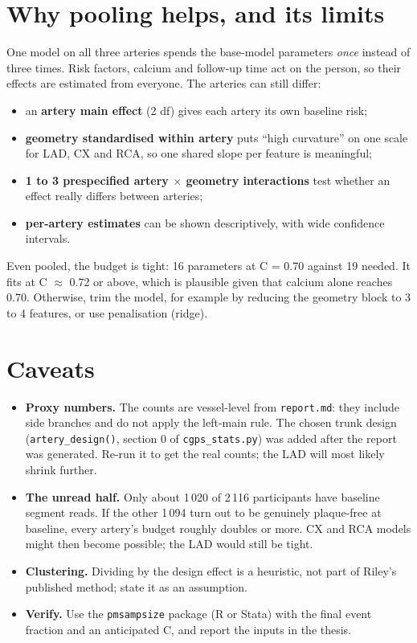 \documentclass[11pt,a4paper]{article}
\begin{document}
\section{Why pooling helps, and its limits}

One model on all three arteries spends the base-model parameters \emph{once} instead of three
times. Risk factors, calcium and follow-up time act on the person, so their effects are estimated
from everyone. The arteries can still differ:
\begin{itemize}
  \item an \textbf{artery main effect} (2 df) gives each artery its own baseline risk;
  \item \textbf{geometry standardised within artery} puts ``high curvature'' on one scale for LAD,
        CX and RCA, so one shared slope per feature is meaningful;
  \item \textbf{1 to 3 prespecified artery $\times$ geometry interactions} test whether an effect
        really differs between arteries;
  \item \textbf{per-artery estimates} can be shown descriptively, with wide confidence intervals.
\end{itemize}

Even pooled, the budget is tight: 16 parameters at C = 0.70 against 19 needed. It fits at
C $\approx$ 0.72 or above, which is plausible given that calcium alone reaches 0.70. Otherwise,
trim the model, for example by reducing the geometry block to 3 to 4 features, or use
penalisation (ridge).

\section{Caveats}

\begin{itemize}
  \item \textbf{Proxy numbers.} The counts are vessel-level from \texttt{report.md}: they include
        side branches and do not apply the left-main rule. The chosen trunk design
        (\texttt{artery\_design()}, section 0 of \texttt{cgps\_stats.py}) was added after the report
        was generated. Re-run it to get the real counts; the LAD will most likely shrink further.
  \item \textbf{The unread half.} Only about 1\,020 of 2\,116 participants have baseline segment
        reads. If the other 1\,094 turn out to be genuinely plaque-free at baseline, every artery's
        budget roughly doubles or more. CX and RCA models might then become possible; the LAD would
        still be tight.
  \item \textbf{Clustering.} Dividing by the design effect is a heuristic, not part of Riley's
        published method; state it as an assumption.
  \item \textbf{Verify.} Use the \texttt{pmsampsize} package (R or Stata) with the final event
        fraction and an anticipated C, and report the inputs in the thesis.
\end{itemize}
\end{document}
